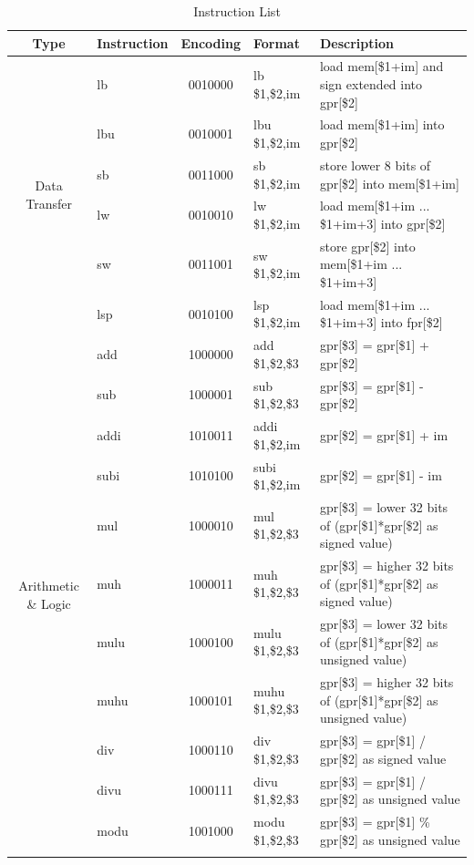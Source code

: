 \documentclass{sig-alternate}
\begin{document}
\begin{table}
\caption{Instruction List}
\label{tab:il}
\centering
\begin{tabular}{|c|l|c|l|l|}
\hline
Type & Instruction & Encoding & Format & Description \\
 \hline
\multirow{6}{*}{Data Transfer} & lb & 0010000 & lb \$1,\$2,im & load mem[\$1+im] and sign extended into gpr[\$2] \\ \cline{2-5}
 & lbu & 0010001 & lbu \$1,\$2,im & load mem[\$1+im] into gpr[\$2] \\ \cline{2-5}
 & sb & 0011000 & sb \$1,\$2,im & store lower 8 bits of gpr[\$2] into mem[\$1+im] \\ \cline{2-5}
 & lw & 0010010 & lw \$1,\$2,im & load mem[\$1+im ... \$1+im+3] into gpr[\$2]\\ \cline{2-5}
 & sw & 0011001 & sw \$1,\$2,im & store gpr[\$2] into mem[\$1+im ... \$1+im+3]\\ \cline{2-5}
 & lsp & 0010100 & lsp \$1,\$2,im & load mem[\$1+im ... \$1+im+3] into fpr[\$2] \\ \hline
\multirow{23}{*}{Arithmetic \& Logic} & add & 1000000 & add \$1,\$2,\$3 & gpr[\$3] = gpr[\$1] + gpr[\$2] \\ \cline{2-5}
 & sub & 1000001 & sub \$1,\$2,\$3& gpr[\$3] = gpr[\$1] - gpr[\$2] \\ \cline{2-5}  
 & addi & 1010011 & addi \$1,\$2,im & gpr[\$2] = gpr[\$1] + im \\ \cline{2-5}
 & subi & 1010100 & subi \$1,\$2,im &  gpr[\$2] = gpr[\$1] - im \\ \cline{2-5}
 & mul & 1000010 & mul \$1,\$2,\$3 & gpr[\$3] = lower 32 bits of (gpr[\$1]*gpr[\$2] as signed value) \\ \cline{2-5}
 & muh & 1000011 & muh \$1,\$2,\$3 & gpr[\$3] = higher 32 bits of (gpr[\$1]*gpr[\$2] as signed value) \\ \cline{2-5}
 & mulu & 1000100 & mulu \$1,\$2,\$3 & gpr[\$3] = lower 32 bits of (gpr[\$1]*gpr[\$2] as unsigned value) \\ \cline{2-5}  
 & muhu & 1000101 & muhu \$1,\$2,\$3 &  gpr[\$3] = higher 32 bits of (gpr[\$1]*gpr[\$2] as unsigned value) \\ \cline{2-5}
 & div & 1000110 & div \$1,\$2,\$3 & gpr[\$3] = gpr[\$1] / gpr[\$2] as signed value \\ \cline{2-5}
 & divu & 1000111 & divu \$1,\$2,\$3 & gpr[\$3] = gpr[\$1] / gpr[\$2] as unsigned value \\ \cline{2-5}
 & modu & 1001000 & modu \$1,\$2,\$3 & gpr[\$3] = gpr[\$1] \% gpr[\$2] as unsigned value \\ \cline{2-5}

\end{tabular}
\end{table}
\end{document}
